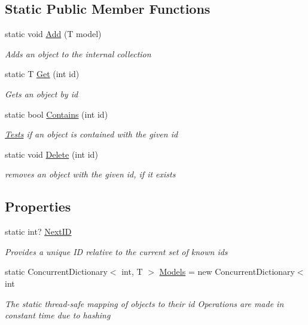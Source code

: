 \subsection*{Static Public Member Functions}
\begin{DoxyCompactItemize}
\item 
static void \mbox{\hyperlink{class_eagle_eye_1_1_models_1_1_repository_aca9fded0480d870f0ec7837700243a2b}{Add}} (T model)
\begin{DoxyCompactList}\small\item\em Adds an object to the internal collection \end{DoxyCompactList}\item 
static T \mbox{\hyperlink{class_eagle_eye_1_1_models_1_1_repository_ac44cb18d8cbb605d3f7e14eb09c8c0bf}{Get}} (int id)
\begin{DoxyCompactList}\small\item\em Gets an object by id \end{DoxyCompactList}\item 
static bool \mbox{\hyperlink{class_eagle_eye_1_1_models_1_1_repository_ad94aecd681043ac78cd50dcde4aaeb0d}{Contains}} (int id)
\begin{DoxyCompactList}\small\item\em \mbox{\hyperlink{namespace_eagle_eye_1_1_tests}{Tests}} if an object is contained with the given id \end{DoxyCompactList}\item 
static void \mbox{\hyperlink{class_eagle_eye_1_1_models_1_1_repository_ad50f201c8f5f1c7794ddf068ed459854}{Delete}} (int id)
\begin{DoxyCompactList}\small\item\em removes an object with the given id, if it exists \end{DoxyCompactList}\end{DoxyCompactItemize}
\subsection*{Properties}
\begin{DoxyCompactItemize}
\item 
static int? \mbox{\hyperlink{class_eagle_eye_1_1_models_1_1_repository_a799dfc419bb17912528a53eff82f50ff}{Next\+ID}}
\begin{DoxyCompactList}\small\item\em Provides a unique ID relative to the current set of known ids \end{DoxyCompactList}\item 
static Concurrent\+Dictionary$<$ int, T $>$ \mbox{\hyperlink{class_eagle_eye_1_1_models_1_1_repository_a26d864f26d5b20030d5c7c3e9400954a}{Models}} = new Concurrent\+Dictionary$<$int
\begin{DoxyCompactList}\small\item\em The static thread-\/safe mapping of objects to their id Operations are made in constant time due to hashing \end{DoxyCompactList}\end{DoxyCompactItemize}


